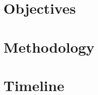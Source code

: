 \documentclass{sydeStyle}
\begin{document}

\chapter{Objectives}

\chapter{Methodology}

\chapter{Timeline}


\end{document}
